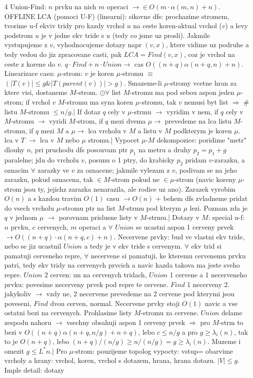 \documentclass[8pt]{extarticle}
\begin{document}
\begin{multicols*}{4}
Union-Find: $n$ prvku na nich $m$ operaci $\rightarrow \in O(m\cdot \alpha(m,n) +n)$. OFFLINE LCA (pomoci U-F) (linearni): sikovne dfs: prochazime stromem, tvorime u-f ekviv tridy pro kazdy vrchol $u$ na ceste koren-aktual vrchol ($v$) a levy podstrom $u$ je v jedne ekv tride s $u$ (tedy co jsme uz prosli). Jakmile vystupujeme z $v$, vyhodnocujeme dotazy napr $(v, x)$, ktere vidime uz podruhe a tedy vedou do jiz zpracovane casti, pak $LCA = Find(v,x)$, coz je vrchol na ceste z korene do $v$. $q \cdot Find + n\cdot Union \rightarrow$ cas $O((n+q)\alpha(n+q,n)+n)$. Linearizace casu: $\mu$-strom: $v$ je koren $\mu$-stromu $\equiv$ $(|T(v)|\leq g \& |T(parent(v))|> g)$. Smazeme-li $\mu$-stromy vcetne hran za ktere visi, dostaneme $M$-strom. $\odot \forall$ list $M$-stromu ma pod sebou aspon jeden $\mu$-strom; if vrchol $v$ $M$-stromu ma syna koren $\mu$-stromu, tak $v$ nemusi byt list $\Rightarrow$ \# listu $M$-stromu $\leq n/g$.| If dotaz $q$ cely v $\mu$-strmu $\rightarrow$ vyridim v nem, if $q$ cely v $M$-stromu $\rightarrow$ vyridi $M$-strom, if $q$ mezi dvema $\mu \rightarrow$ prevedeme na lca listu $M$-stromu, if $q$ mezi $M$ a $\mu \rightarrow$ lca vrcholu v $M$ a listu v $M$ podkterym je koren $\mu$. lca v $T$ $\rightarrow$ lca v $M$ nebo $\mu$ stromu.| Vypocet $\mu$-$M$ dekompozice: poridime "metr" dlouhy $n$, pri pruchodu dfs posouvam ptr $p_1$ na metru a druhy $p_2=p_1+g$ paralelne; jdu do vrcholu $v$, posunu o 1 ptry, do krabicky $p_2$ pridam $v$-zarazku, a oznacim $\forall$ zarazky ve $v$ za oznacene; jakmile vylezam z $v$, podivam se na jeho zarazku, pokud oznacena, tak $\in M$-strom pokud ne $\in \mu$-strom (navic koreny $\mu$-strom jsou ty, jejichz zarazka nenarazila, ale rodice uz ano). Zarazek vyrobim $O(n)$ a s kazdou travim $O(1)$ casu $\rightarrow O(n)$ + behem dfs zvladneme pridat do vsech vrcholu $\mu$-stromu ptr na list $M$-strmu pod kterym $\mu$ lezi. Poznam zda je $q$ v jednom $\mu$ $\rightarrow$ porovnam prislusne listy v $M$-strmu.| Dotazy v $M$: special u-f: $n$ prvku, $c$ cervenych, $m$ operaci a $\forall$ $Union$ se ucastni aspon 1 cerveny prvek $\rightarrow O((n+q)\cdot\alpha(n+q, c)+n)$. Necervene prvky: bud ve vlastni ekv tride, nebo se jiz ucastnil $Union$ a tedy je v ekv tride s cervenym. $\forall$ ekv trid si pamatuji cerveneho repre, $\forall$ necervene si pamatuji, ke kteremu cervenemu prvku patri, tedy ekv tridy na cervenych prvcich a navic kazda takova ma jeste sveho repre. $Union$ 2 cerven: un na cervenych tridach, $Union$ 1 cervene a 1 necerveneho prvku: povesime necerveny prvek pod repre te cervene. $Find$ 1 necerveny 2. jakykoliv $\rightarrow$ vzdy ne, 2 necervene prevedeme na 2 cervene pod kterymi jsou poveseni, $Find$ dvou cerven, normal. Necervene prvky stoji $O(1)$ navic a vse ostatni bezi na cervenych. Prohlasime listy $M$-stromu za cervene. $Union$ delame zespodu nahoru $\rightarrow$ vsechny obsahuji aspon 1 cerveny prvek $\Rightarrow$ pro $M$-strm to bezi v $O((n+q)\alpha(n+q, n/g) +n+q)$, lebo $c\leq n/g$ a pro $g \geq \lambda_i(n)$, tak to je $O(n+q)$, lebo $(n+q)/(n/g)\geq n/(n/g) = g \geq \lambda_i(n)$. Muzeme i omezit $g\leq L^*n$.| Pro $\mu$-strom: pouzijeme topolog vypocty: vstup= obarvime vrcholy a hrany: vrchol, koren, vrchol s dotazem, hrana, hrana dotazu. $|V|\leq g$. Imple detail: dotazy 
\end{multicols*}
\end{document}
